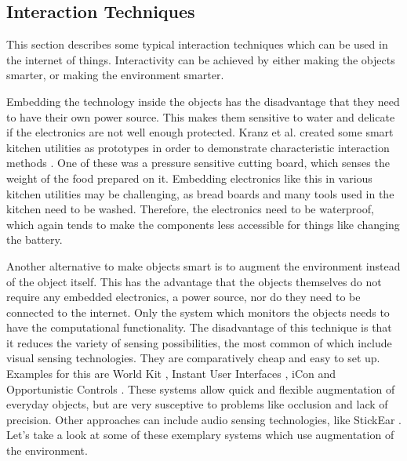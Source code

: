 \subsection{Interaction Techniques}
This section describes some typical interaction techniques which can be used in the internet of things. Interactivity can be achieved by either making the objects smarter, or making the environment smarter.

Embedding the technology inside the objects has the disadvantage that they need to have their own power source.
This makes them sensitive to water and delicate if the electronics are not well enough protected.
Kranz et al. created some smart kitchen utilities as prototypes in order to demonstrate characteristic interaction methods \cite{kranz10}. 
One of these was a pressure sensitive cutting board, which senses the weight of the food prepared on it. 
Embedding electronics like this in various kitchen utilities may be challenging, as bread boards and many tools used in the kitchen need to be washed. 
Therefore, the electronics need to be waterproof, which again tends to make the components less accessible for things like changing the battery.

Another alternative to make objects smart is to augment the environment instead of the object itself. 
This has the advantage that the objects themselves do not require any embedded electronics, a power source, nor do they need to be connected to the internet. 
Only the system which monitors the objects needs to have the computational functionality. 
The disadvantage of this technique is that it reduces the variety of sensing possibilities, the most common of which include visual sensing technologies. 
They are comparatively cheap and easy to set up. 
Examples for this are World Kit \cite{xiao13}, Instant User Interfaces \cite{corsten13}, iCon \cite{cheng10} and Opportunistic Controls \cite{henderson08}. 
These systems allow quick and flexible augmentation of everyday objects, but are very susceptive to problems like occlusion and lack of precision.
Other approaches can include audio sensing technologies, like StickEar \cite{yeo13}. Let's take a look at some of these exemplary systems which use augmentation of the environment.

